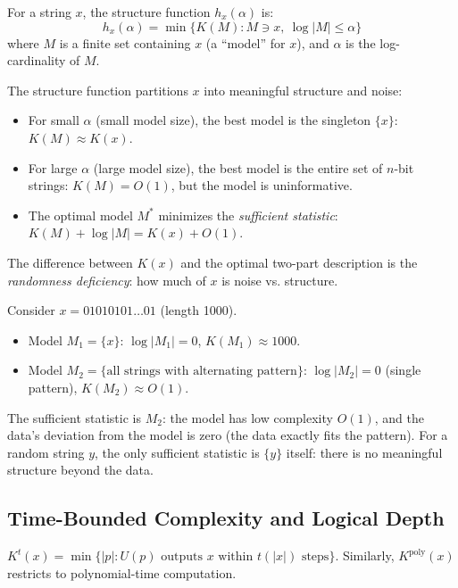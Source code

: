 \begin{definition}
For a string $x$, the structure function $h_x(\alpha)$ is:
\[
h_x(\alpha) = \min \{ K(M) : M \ni x,\ \log |M| \le \alpha \}
\]
where $M$ is a finite set containing $x$ (a ``model'' for $x$), and $\alpha$ is the log-cardinality of $M$.
\end{definition}

The structure function partitions $x$ into meaningful structure and noise:
\begin{itemize}
\item For small $\alpha$ (small model size), the best model is the singleton $\{x\}$: $K(M) \approx K(x)$.
\item For large $\alpha$ (large model size), the best model is the entire set of $n$-bit strings: $K(M) = O(1)$, but the model is uninformative.
\item The optimal model $M^*$ minimizes the \emph{sufficient statistic}: $K(M) + \log |M| = K(x) + O(1)$.
\end{itemize}

The difference between $K(x)$ and the optimal two-part description is the \emph{randomness deficiency}: how much of $x$ is noise vs. structure.

\begin{example}
Consider $x = 01010101\ldots01$ (length 1000). 
\begin{itemize}
\item Model $M_1 = \{x\}$: $\log |M_1| = 0$, $K(M_1) \approx 1000$.
\item Model $M_2 = \{\text{all strings with alternating pattern}\}$: $\log |M_2| = 0$ (single pattern), $K(M_2) \approx O(1)$.
\end{itemize}
The sufficient statistic is $M_2$: the model has low complexity $O(1)$, and the data's deviation from the model is zero (the data exactly fits the pattern). For a random string $y$, the only sufficient statistic is $\{y\}$ itself: there is no meaningful structure beyond the data.
\end{example}

\subsection{Time-Bounded Complexity and Logical Depth}
\label{sec:kolmogorov:time}

\begin{definition}
$K^t(x) = \min \{ |p| : U(p) \text{ outputs } x \text{ within } t(|x|) \text{ steps} \}$.
Similarly, $K^{\text{poly}}(x)$ restricts to polynomial-time computation.
\end{definition}

